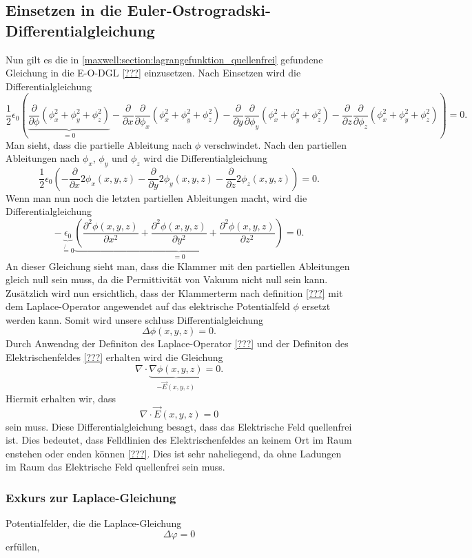 \subsection{Einsetzen in die Euler-Ostrogradski-Differentialgleichung}
Nun gilt es die in \eqref{maxwell:section:lagrangefunktion_quellenfrei} gefundene Gleichung in die E-O-DGL \ref{???} einzusetzen.
Nach Einsetzen wird die Differentialgleichung
\[
\frac{1}{2}\epsilon_0\left(\underbrace{\frac{\partial}{\partial\phi}\left(\phi_x^2 + \phi_y^2 + \phi_z^2\right)}_{=0} - \frac{\partial}{\partial x}\frac{\partial}{\partial \phi_x}\left(\phi_x^2 + \phi_y^2 + \phi_z^2\right) - 
\frac{\partial}{\partial y}\frac{\partial}{\partial \phi_y}\left(\phi_x^2 + \phi_y^2 + \phi_z^2\right) - 
\frac{\partial}{\partial z}\frac{\partial}{\partial \phi_z}\left(\phi_x^2 + \phi_y^2 + \phi_z^2\right)\right)
=
0.
\]
Man sieht, dass die partielle Ableitung nach $\phi$ verschwindet.
Nach den partiellen Ableitungen nach $\phi_x$, $\phi_y$ und $\phi_z$ wird die Differentialgleichung
\[
\frac{1}{2}\epsilon_0\left(-\frac{\partial}{\partial x}2\phi_x(x,y,z) - \frac{\partial}{\partial y}2\phi_y(x,y,z) - \frac{\partial}{\partial z}2\phi_z(x,y,z)\right)
=
0.
\]
Wenn man nun noch die letzten partiellen Ableitungen macht, wird die Differentialgleichung
\begin{equation}
- \underbrace{\epsilon_0}_{\not{=}0}\underbrace{\left(\frac{\partial^2\phi(x,y,z)}{\partial x^2} + \frac{\partial^2\phi(x,y,z)}{\partial y^2} + \frac{\partial^2\phi(x,y,z)}{\partial z^2}\right)}_{=0}
=
0.
\label{maxwell:section:laplace_gleichung_1}
\end{equation}
An dieser Gleichung sieht man, dass die Klammer mit den partiellen Ableitungen gleich null sein muss, da die Permittivität von Vakuum nicht null sein kann.
Zusätzlich wird nun ersichtlich, dass der Klammerterm nach definition \ref{???} mit dem Laplace-Operator angewendet auf das elektrische Potentialfeld $\phi$ ersetzt werden kann.
Somit wird unsere schluss Differentialgleichung
\begin{equation}
\Delta\phi(x,y,z)
=
0.
\label{maxwell:section:laplace_gleichung_2}
\end{equation}
Durch Anwendng der Definiton des Laplace-Operator \ref{???} und der Definiton des Elektrischenfeldes \ref{???} erhalten wird die Gleichung
\[
\nabla\cdot\underbrace{\nabla\phi(x,y,z)}_{-\vec{E}(x,y,z)}
=
0.
\]
Hiermit erhalten wir, dass
\begin{equation}
\nabla\cdot\vec{E}(x,y,z)
=
0
\label{maxwell:section:e_feld_quellenfrei}
\end{equation}
sein muss. Diese Differentialgleichung besagt, dass das Elektrische Feld quellenfrei ist.
Dies bedeutet, dass Felldlinien des Elektrischenfeldes an keinem Ort im Raum enstehen oder enden können \ref{???}.
Dies ist sehr naheliegend, da ohne Ladungen im Raum das Elektrische Feld quellenfrei sein muss.

\subsubsection{Exkurs zur Laplace-Gleichung}
Potentialfelder, die die Laplace-Gleichung
\[
\Delta\varphi
=
0
\]
erfüllen, 




